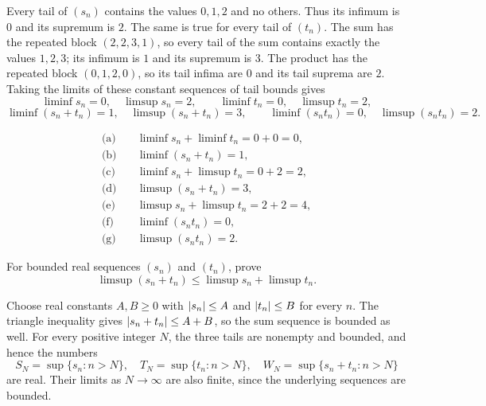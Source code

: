 Every tail of $(s_n)$ contains the values $0,1,2$ and no others.
Thus its infimum is $0$ and its supremum is $2$. The same is true
for every tail of $(t_n)$. The sum has the repeated block
$(2,2,3,1)$, so every tail of the sum contains exactly the values
$1,2,3$; its infimum is $1$ and its supremum is $3$.
The product has the repeated block $(0,1,2,0)$, so its tail infima
are $0$ and its tail suprema are $2$.
Taking the limits of these constant sequences of tail bounds gives
\[
 \liminf s_n=0,\quad\limsup s_n=2,\qquad
 \liminf t_n=0,\quad\limsup t_n=2,
\]
\[
 \liminf(s_n+t_n)=1,\quad\limsup(s_n+t_n)=3,
 \qquad
 \liminf(s_nt_n)=0,\quad\limsup(s_nt_n)=2.
\]

\begin{align*}
 \text{(a)}\quad&\liminf s_n+\liminf t_n=0+0=\boxed{0},\\
 \text{(b)}\quad&\liminf(s_n+t_n)=\boxed{1},\\
 \text{(c)}\quad&\liminf s_n+\limsup t_n=0+2=\boxed{2},\\
 \text{(d)}\quad&\limsup(s_n+t_n)=\boxed{3},\\
 \text{(e)}\quad&\limsup s_n+\limsup t_n=2+2=\boxed{4},\\
 \text{(f)}\quad&\liminf(s_nt_n)=\boxed{0},\\
 \text{(g)}\quad&\limsup(s_nt_n)=\boxed{2}.
\end{align*}



\goal For bounded real sequences $(s_n)$ and $(t_n)$, prove
\[
 \limsup(s_n+t_n)\le\limsup s_n+\limsup t_n.
\]

Choose real constants $A,B\ge0$ with $\left|s_n\right|\le A$ and
$\left|t_n\right|\le B$ for every $n$. The triangle inequality gives
$\left|s_n+t_n\right|\le A+B$, so the sum sequence is bounded as well.
For every positive integer $N$, the three tails are nonempty and
bounded, and hence the numbers
\[
 S_N=\sup\{s_n:n>N\},\quad T_N=\sup\{t_n:n>N\},\quad
 W_N=\sup\{s_n+t_n:n>N\}
\]
are real. Their limits as $N\to\infty$ are also finite, since the
underlying sequences are bounded.

